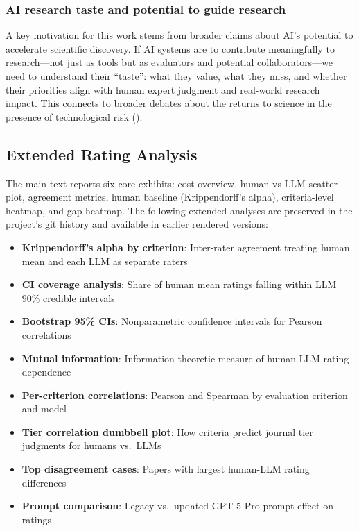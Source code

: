 \documentclass[
  11pt,
  letterpaper,
]{article}
\providecommand{\tightlist}{%
  \setlength{\itemsep}{0pt}\setlength{\parskip}{0pt}}
\begin{document}
\subsubsection{AI research taste and potential to guide
research}\label{ai-research-taste-and-potential-to-guide-research}

A key motivation for this work stems from broader claims about AI's
potential to accelerate scientific discovery. If AI systems are to
contribute meaningfully to research---not just as tools but as
evaluators and potential collaborators---we need to understand their
``taste'': what they value, what they miss, and whether their priorities
align with human expert judgment and real-world research impact. This
connects to broader debates about the returns to science in the presence
of technological risk ().

\subsection{Extended Rating Analysis}\label{extended-rating-analysis}

The main text reports six core exhibits: cost overview, human-vs-LLM
scatter plot, agreement metrics, human baseline (Krippendorff's alpha),
criteria-level heatmap, and gap heatmap. The following extended analyses
are preserved in the project's git history and available in earlier
rendered versions:

\begin{itemize}
\tightlist
\item
  \textbf{Krippendorff's alpha by criterion}: Inter-rater agreement
  treating human mean and each LLM as separate raters
\item
  \textbf{CI coverage analysis}: Share of human mean ratings falling
  within LLM 90\% credible intervals
\item
  \textbf{Bootstrap 95\% CIs}: Nonparametric confidence intervals for
  Pearson correlations
\item
  \textbf{Mutual information}: Information-theoretic measure of
  human-LLM rating dependence
\item
  \textbf{Per-criterion correlations}: Pearson and Spearman by
  evaluation criterion and model
\item
  \textbf{Tier correlation dumbbell plot}: How criteria predict journal
  tier judgments for humans vs.~LLMs
\item
  \textbf{Top disagreement cases}: Papers with largest human-LLM rating
  differences
\item
  \textbf{Prompt comparison}: Legacy vs.~updated GPT-5 Pro prompt effect
  on ratings
\end{itemize}
\end{document}
